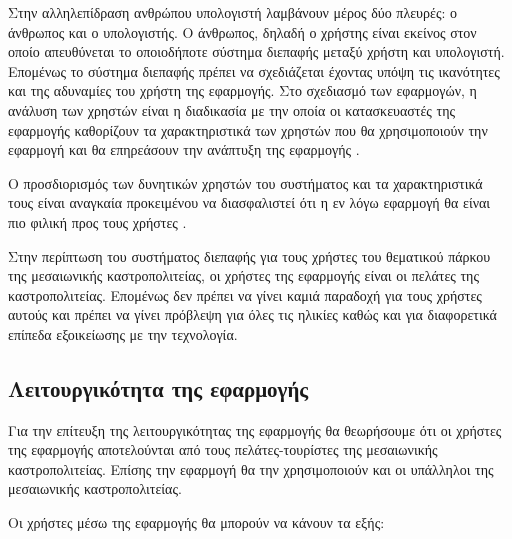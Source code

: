 \documentclass{assignment}
\begin{document}
Στην αλληλεπίδραση ανθρώπου υπολογιστή λαμβάνουν μέρος δύο πλευρές: ο άνθρωπος και ο υπολογιστής. Ο άνθρωπος, δηλαδή ο χρήστης είναι εκείνος στον οποίο απευθύνεται το οποιοδήποτε σύστημα διεπαφής μεταξύ χρήστη και υπολογιστή. Επομένως το σύστημα διεπαφής πρέπει να σχεδιάζεται έχοντας υπόψη τις ικανότητες και της αδυναμίες του χρήστη της εφαρμογής. Στο σχεδιασμό των εφαρμογών, η ανάλυση των χρηστών είναι η διαδικασία με την οποία οι κατασκευαστές της εφαρμογής καθορίζουν τα χαρακτηριστικά των χρηστών που θα χρησιμοποιούν την εφαρμογή και θα επηρεάσουν την ανάπτυξη της εφαρμογής \cite{wiki:user_analysis,class_notes}.

Ο προσδιορισμός των δυνητικών χρηστών του συστήματος και τα χαρακτηριστικά τους είναι αναγκαία προκειμένου να διασφαλιστεί ότι η εν λόγω εφαρμογή θα είναι πιο φιλική προς τους χρήστες \cite{wiki:user_analysis}.

Στην περίπτωση του συστήματος διεπαφής για τους χρήστες του θεματικού πάρκου της μεσαιωνικής καστροπολιτείας, οι χρήστες της εφαρμογής είναι οι πελάτες της καστροπολιτείας. Επομένως δεν πρέπει να γίνει καμιά παραδοχή για τους χρήστες αυτούς και πρέπει να γίνει πρόβλεψη για όλες τις ηλικίες καθώς και για διαφορετικά επίπεδα εξοικείωσης με την τεχνολογία. 

\subsection{Λειτουργικότητα της εφαρμογής}

Για την επίτευξη της λειτουργικότητας της εφαρμογής θα θεωρήσουμε ότι οι χρήστες της εφαρμογής αποτελούνται από τους πελάτες-τουρίστες της μεσαιωνικής καστροπολιτείας. Επίσης την εφαρμογή θα την χρησιμοποιούν και οι υπάλληλοι της μεσαιωνικής καστροπολιτείας.


Οι χρήστες μέσω της εφαρμογής θα μπορούν να κάνουν τα εξής:
\end{document}

